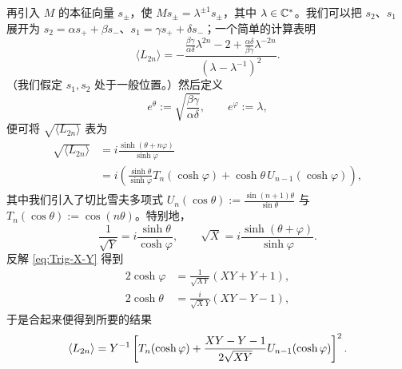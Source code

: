 再引入 $M$ 的本征向量 $s_\pm$，使 $M s_\pm = \lambda^{\pm 1} s_{\pm}$，其中 $\lambda \in \mathbb{C}^*$。我们可以把 $s_2$、$s_1$ 展开为 $s_2 = \alpha s_+ + \beta s_-$、$s_1 = \gamma s_+ + \delta s_-$；一个简单的计算表明
\begin{equation}
\langle L_{2n} \rangle = - \frac{ \frac{\beta \gamma}{\alpha\delta} \lambda^{2n} - 2 + \frac{\alpha \delta }{\beta \gamma} \lambda^{-2n} }{(\lambda - \lambda^{-1})^2}.
\end{equation}
（我们假定 $s_1, s_2$ 处于一般位置。）然后定义
\begin{equation}
e^{ \theta}:= \sqrt{\frac{\beta \gamma}{\alpha\delta} }, \qquad e^{\varphi}:=\lambda,
\end{equation}
便可将 $\sqrt{\langle L_{2n} \rangle}$ 表为
\begin{align}\label{eq:Trig-Ln}
\begin{split}
\sqrt{\langle L_{2n} \rangle } & = i \frac{\sinh(\theta + n \varphi)}{\sinh\varphi} \\
& = i \left( \frac{\sinh\theta}{\sinh\varphi} T_n(\cosh\varphi) + \cosh\theta \, U_{n-1}(\cosh\varphi)\right),
\end{split}
\end{align}
其中我们引入了切比雪夫多项式 $U_n(\cos\theta) := \frac{\sin(n+1)\theta}{\sin\theta}$ 与 $T_n(\cos\theta) := \cos(n\theta)$。特别地，
\begin{equation}\label{eq:Trig-X-Y}
\frac{1}{\sqrt{Y}} = i \frac{\sinh\theta}{\cosh\varphi}, \qquad \sqrt{X} = i \frac{\sinh(\theta+\varphi)}{\sinh\varphi}.
\end{equation}
反解 \eqref{eq:Trig-X-Y} 得到
\begin{align}\label{eq:solve-coshphi}
 2\cosh \varphi &= \frac{1}{\sqrt{XY}} \left( XY + Y + 1 \right), \\
 2\cosh \theta &= \frac{i}{ \sqrt{X}Y}(XY-Y-1),
\end{align}
于是合起来便得到所要的结果
\begin{equation}
\langle L_{2n} \rangle = Y^{-1} \left[T_n(\cosh\varphi) + \frac{XY- Y - 1}{2 \sqrt{X Y}} U_{n-1}(\cosh\varphi) \right]^2.
\end{equation}

